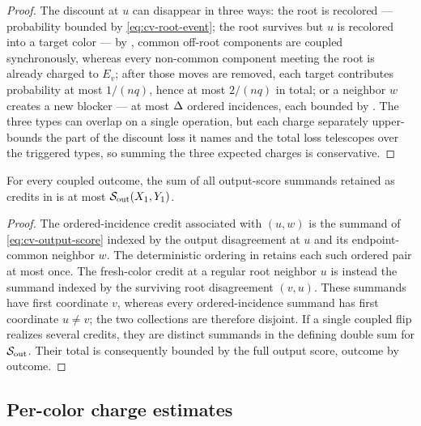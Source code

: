 \begin{proof}
The discount at $u$ can disappear in three ways: the root is recolored ---
probability bounded by \eqref{eq:cv-root-event}; the root survives but $u$
is recolored into a target color --- by
, common off-root components are coupled synchronously,
whereas every non-common component meeting the root is already charged to
$E_v$; after those moves are removed, each target contributes probability
at most $1/(nq)$, hence at most $2/(nq)$ in total; or a neighbor $w$ creates a new
blocker --- at most $\Delta$ ordered incidences, each bounded by
. The three types can overlap on a single
operation, but each charge separately upper-bounds the part of the discount
loss it names and the total loss telescopes over the triggered types, so
summing the three expected charges is conservative.
\end{proof}

\begin{lemma}\label{lem:cv-credit-disjoint}
For every coupled outcome, the sum of all output-score summands retained as
credits in  is at most
\(\mathcal S_{\rm out}(X_1,Y_1)\).
\end{lemma}

\begin{proof}
The ordered-incidence credit associated with \((u,w)\) is the summand of
\eqref{eq:cv-output-score} indexed by the output disagreement at \(u\) and
its endpoint-common neighbor \(w\).  The deterministic ordering in
 retains each such ordered pair at most once.
The fresh-color credit at a regular root neighbor \(u\) is instead the
summand indexed by the surviving root disagreement \((v,u)\).  These
summands have first coordinate \(v\), whereas every ordered-incidence
summand has first coordinate \(u\ne v\); the two collections are therefore
disjoint.  If a single coupled flip realizes several credits, they are
distinct summands in the defining double sum for
\(\mathcal S_{\rm out}\).  Their total is consequently bounded by the full
output score, outcome by outcome.
\end{proof}

\subsection{Per-color charge estimates}

